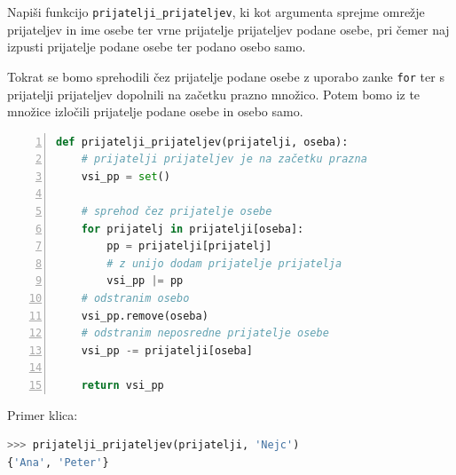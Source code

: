 \begin{zgled}
Napiši funkcijo \texttt{prijatelji\_prijateljev}, ki kot argumenta sprejme omrežje prijateljev in ime osebe ter vrne prijatelje prijateljev podane osebe, pri čemer naj izpusti prijatelje podane osebe ter podano osebo samo.
\end{zgled}
\begin{resitev}
Tokrat se bomo sprehodili čez prijatelje podane osebe z uporabo zanke \texttt{for} ter s prijatelji prijateljev dopolnili na začetku prazno množico. Potem bomo iz te množice izločili prijatelje podane osebe in osebo samo.
\begin{lstlisting}[language=Python,numbers=left]
def prijatelji_prijateljev(prijatelji, oseba):
    # prijatelji prijateljev je na začetku prazna
    vsi_pp = set() 
    
    # sprehod čez prijatelje osebe
    for prijatelj in prijatelji[oseba]:
        pp = prijatelji[prijatelj]
        # z unijo dodam prijatelje prijatelja
        vsi_pp |= pp 
    # odstranim osebo
    vsi_pp.remove(oseba)
    # odstranim neposredne prijatelje osebe
    vsi_pp -= prijatelji[oseba]
    
    return vsi_pp

\end{lstlisting}
Primer klica:
\begin{lstlisting}[language=Python]
>>> prijatelji_prijateljev(prijatelji, 'Nejc')
{'Ana', 'Peter'}
\end{lstlisting}
\end{resitev}


